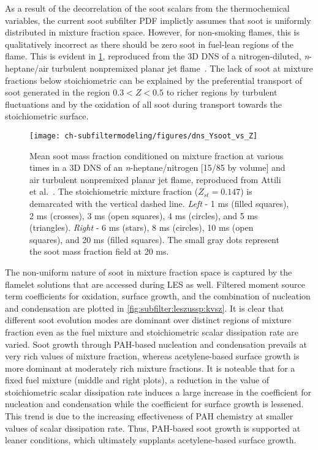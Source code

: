 As a result of the decorrelation of the soot scalars from the thermochemical variables, the current soot subfilter PDF implictly assumes that soot is uniformly distributed in mixture fraction space. However, for non-smoking flames, this is qualitatively incorrect as there should be zero soot in fuel-lean regions of the flame. This is evident in \cref{fig:subfilter:leszussp:ysvsz}, reproduced from the 3D DNS of a nitrogen-diluted, \textit{n}-heptane/air turbulent nonpremixed planar jet flame~\cite{attili2014}. The lack of soot at mixture fractions below stoichiometric can be explained by the preferential transport of soot generated in the region $0.3 < Z < 0.5$ to richer regions by turbulent fluctuations and by the oxidation of all soot during transport towards the stoichiometric surface. 

\begin{figure}[htb]
  \begin{center}
    \texttt{[image: ch-subfiltermodeling/figures/dns\_Ysoot\_vs\_Z]}
    \caption[DNS of Turbulent Nonpremixed / Jet Flame, \texorpdfstring{$\langle Y_{\text{s}}|Z \rangle$}{<Ys|Z>} vs. \texorpdfstring{$Z$}{Z}]{Mean soot mass fraction conditioned on mixture fraction at various times in a 3D DNS of an \textit{n}-heptane/nitrogen [15/85 by volume] and air turbulent nonpremixed planar jet flame, reproduced from Attili et al.~\cite{attili2014}. The stoichiometric mixture fraction ($Z_{st} = 0.147$) is demarcated with the vertical dashed line. \textit{Left} - 1 ms (filled squares), 2 ms (crosses), 3 ms (open squares), 4 ms (circles), and 5 ms (triangles). \textit{Right} - 6 ms (stars), 8 ms (circles), 10 ms (open squares), and 20 ms (filled squares). The small gray dots represent the soot mass fraction field at 20 ms.}
    \label{fig:subfilter:leszussp:ysvsz}
  \end{center}
\end{figure}

The non-uniform nature of soot in mixture fraction space is captured by the flamelet solutions that are accessed during LES as well. Filtered moment source term coefficients for oxidation, surface growth, and the combination of nucleation and condensation are plotted in \cref{fig:subfilter:leszussp:kvsz}. It is clear that different soot evolution modes are dominant over distinct regions of mixture fraction even as the fuel mixture and stoichiometric scalar dissipation rate are varied. Soot growth through PAH-based nucleation and condensation prevails at very rich values of mixture fraction, whereas acetylene-based surface growth is more dominant at moderately rich mixture fractions. It is noteable that for a fixed fuel mixture (middle and right plots), a reduction in the value of stoichiometric scalar dissipation rate induces a large increase in the coefficient for nucleation and condensation while the coefficient for surface growth is lessened. This trend is due to the increasing effectiveness of PAH chemistry at smaller values of scalar dissipation rate. Thus, PAH-based soot growth is supported at leaner conditions, which ultimately supplants acetylene-based surface growth.

